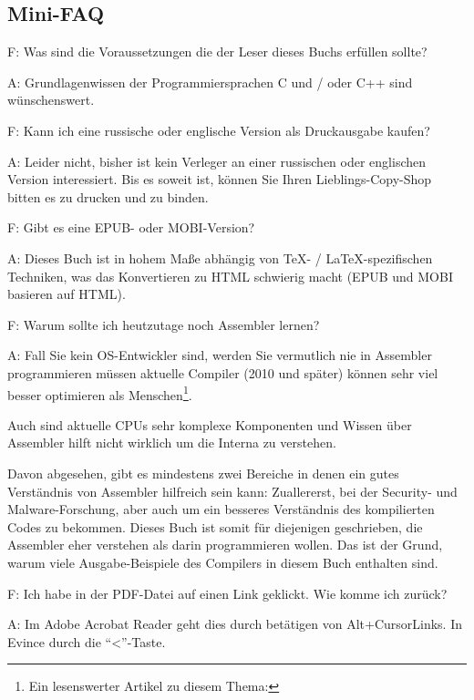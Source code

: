\subsection*{Mini-FAQ}

\par F: Was sind die Voraussetzungen die der Leser dieses Buchs erfüllen sollte?
\par A: Grundlagenwissen der Programmiersprachen C und / oder C++ sind wünschenswert.
\par F: Kann ich eine russische oder englische Version als Druckausgabe kaufen?
\par A: Leider nicht, bisher ist kein Verleger an einer russischen oder englischen Version interessiert.
Bis es soweit ist, können Sie Ihren Lieblings-Copy-Shop bitten es zu drucken und zu binden.

\par F: Gibt es eine EPUB- oder MOBI-Version?
\par A: Dieses Buch ist in hohem Maße abhängig von \TeX{}- / \LaTeX{}-spezifischen Techniken,
was das Konvertieren zu HTML schwierig macht (EPUB und MOBI basieren auf HTML).

\par F: Warum sollte ich heutzutage noch Assembler lernen?
\par A: Fall Sie kein \ac{OS}-Entwickler sind, werden Sie vermutlich nie in Assembler programmieren müssen \textemdash{}
aktuelle Compiler (2010 und später) können sehr viel besser optimieren als Menschen\footnote{Ein lesenswerter Artikel zu diesem Thema: \InSqBrackets{\AgnerFog}}.

Auch sind aktuelle \ac{CPU}s sehr komplexe Komponenten und Wissen über Assembler hilft nicht wirklich
um die Interna zu verstehen.

Davon abgesehen, gibt es mindestens zwei Bereiche in denen ein gutes Verständnis von Assembler hilfreich
sein kann: Zuallererst, bei der Security- und Malware-Forschung, aber auch um ein besseres Verständnis des kompilierten
Codes zu bekommen.
Dieses Buch ist somit für diejenigen geschrieben, die Assembler eher verstehen als darin programmieren wollen.
Das ist der Grund, warum viele Ausgabe-Beispiele des Compilers in diesem Buch enthalten sind.

\par F: Ich habe in der PDF-Datei auf einen Link geklickt. Wie komme ich zurück?
\par A: Im Adobe Acrobat Reader geht dies durch betätigen von Alt+CursorLinks.
In Evince durch die ``<''-Taste.

